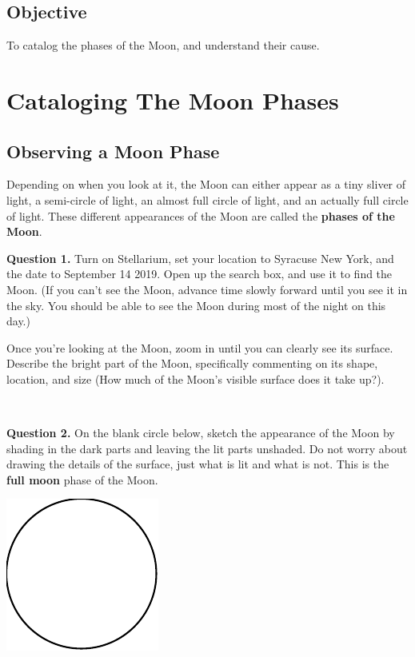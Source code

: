 \documentclass[11pt]{article}
\begin{document}
\subsection*{Objective}

To catalog the phases of the Moon, and understand their cause.

\newpage

\section{Cataloging The Moon Phases}

\subsection{Observing a Moon Phase}

Depending on when you look at it, the Moon can either appear as a tiny sliver of light, a semi-circle of light, an almost full circle of light, and an actually full circle of light. These different appearances of the Moon are called the \textbf{phases of the Moon}.

\noindent
\textbf{Question 1.} Turn on Stellarium, set your location to Syracuse New York, and the date to September 14 2019. Open up the search box, and use it to find the Moon. (If you can't see the Moon, advance time slowly forward until you see it in the sky. You should be able to see the Moon during most of the night on this day.)

Once you're looking at the Moon, zoom in until you can clearly see its surface.\\

Describe the bright part of the Moon, specifically commenting on its shape, location, and size (How much of the Moon's visible surface does it take up?).\\
\vspace*{1.5cm}

\hrulefill\\
\noindent

\textbf{Question 2.} On the blank circle below, sketch the appearance of the Moon by shading in the dark parts and leaving the lit parts unshaded. Do not worry about drawing the details of the surface, just what is lit and what is not. This is the \textbf{full moon} phase of the Moon.\\
\begin{center}
	\includegraphics{blank_moon}
\end{center}
\end{document}
